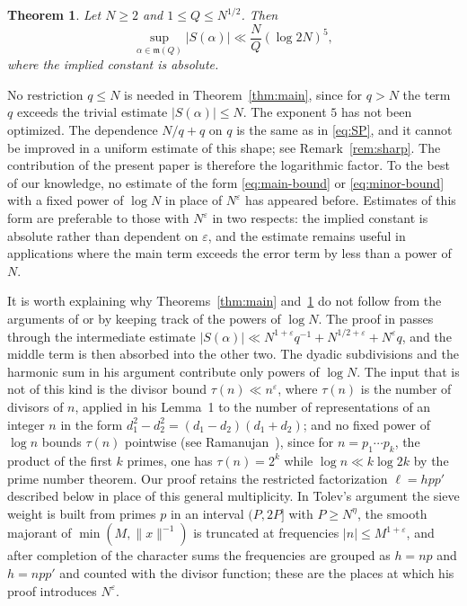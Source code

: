 \documentclass[11pt]{amsart}
\numberwithin{equation}{section}
\numberwithin{figure}{section}
\newtheorem{theorem}{Theorem}[section]
\theoremstyle{definition}
\newcommand{\eps}{\varepsilon}
\newcommand{\Minor}{\mathfrak{m}}
\begin{document}
\begin{theorem}\label{thm:minor}
Let $N\ge2$ and $1\le Q\le N^{1/2}$.  Then
\begin{equation}\label{eq:minor-bound}
  \sup_{\alpha\in\Minor(Q)}|S(\alpha)|\ll\frac NQ(\log 2N)^{5},
\end{equation}
where the implied constant is absolute.
\end{theorem}

No restriction $q\le N$ is needed in Theorem~\ref{thm:main}, since for
$q>N$ the term $q$ exceeds the trivial estimate $|S(\alpha)|\le N$.  The
exponent $5$ has not been optimized.  The dependence $N/q+q$ on $q$ is the
same as in \eqref{eq:SP}, and it cannot be improved in a uniform estimate
of this shape; see Remark~\ref{rem:sharp}.  The contribution of the present
paper is therefore the logarithmic factor.  To the best of our knowledge,
no estimate of the form \eqref{eq:main-bound} or \eqref{eq:minor-bound}
with a fixed power of $\log N$ in place of $N^{\eps}$ has appeared before.  Estimates of this form are
preferable to those with $N^{\eps}$ in two respects: the implied constant
is absolute rather than dependent on $\eps$, and the estimate remains
useful in applications where the main term exceeds the error term by
less than a power of $N$.

It is worth explaining why Theorems~\ref{thm:main} and~\ref{thm:minor} do
not follow from the arguments of \cite{SP} or \cite{Tolev} by keeping track
of the powers of $\log N$.  The proof in \cite{SP} passes through the
intermediate estimate
$|S(\alpha)|\ll N^{1+\eps}q^{-1}+N^{1/2+\eps}+N^{\eps}q$, and the middle
term is then absorbed into the other two.  The dyadic subdivisions and the harmonic sum in his argument contribute
only powers of $\log N$.  The input that is not of this kind is the divisor
bound $\tau(n)\ll n^{\eps}$, where $\tau(n)$ is the number of divisors of
$n$, applied in his Lemma~1 to the number of
representations of an integer $n$ in the form
$d_1^2-d_2^2=(d_1-d_2)(d_1+d_2)$; and no fixed power of $\log n$ bounds
$\tau(n)$ pointwise (see Ramanujan~\cite{Ramanujan}), since for
$n=p_1\cdots p_k$, the product of the first $k$ primes, one has $\tau(n)=2^k$ while $\log n\ll k\log 2k$ by the prime
number theorem.  Our proof retains the restricted factorization
$\ell=hpp'$ described below in place of this general multiplicity.  In Tolev's argument the sieve weight is built from
primes $p$ in an interval $(P,2P]$ with $P\ge N^{\eta}$, the smooth
majorant of $\min(M,\|x\|^{-1})$ is truncated at frequencies
$|n|\le M^{1+\eps}$, and after completion of the character sums the
frequencies are grouped as $h=np$ and $h=npp'$ and counted with the divisor
function; these are the places at which his proof introduces $N^{\eps}$.
\end{document}
